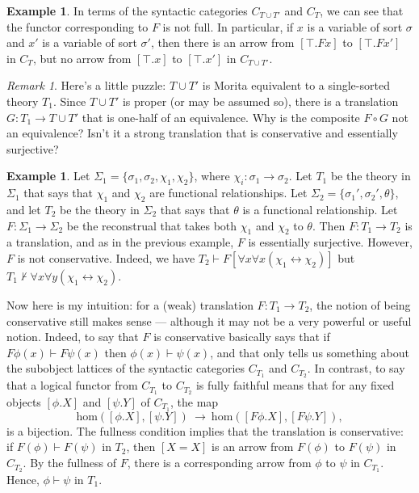 \documentclass[12pt]{article}
\theoremstyle{definition}
\newtheorem{example}[prop]{Example}
\theoremstyle{remark}
\newtheorem*{note}{Remark}
\newcommand{\3}{\mathcal}
\begin{document}
\begin{example}
  In terms of the syntactic categories $C_{T\cup T'}$ and $C_{T}$,
  we can see that the functor corresponding to $F$ is not full. In
  particular, if $x$ is a variable of sort $\sigma$ and $x'$ is a
  variable of sort $\sigma '$, then there is an arrow from
  $[\top .Fx]$ to $[\top .Fx']$ in $C_{T}$, but no arrow from
  $[\top .x]$ to $[\top .x']$ in $C_{T\cup T'}$.  \end{example}

\begin{note} Here's a little puzzle: $T\cup T'$ is Morita equivalent
  to a single-sorted theory $T_1$.  Since $T\cup T'$ is proper (or may
  be assumed so), there is a translation $G:T_1\to T\cup T'$ that is
  one-half of an equivalence. Why is the composite $F\circ G$ not an
  equivalence? Isn't it a strong translation that is conservative and
  essentially surjective? \end{note}

\begin{example} Let
  $\Sigma _1 = \{ \sigma _1,\sigma _2,\chi _1,\chi _2\}$, where
  $\chi _i:\sigma _1\to \sigma _2$. Let $T_1$ be the theory in
  $\Sigma _1$ that says that $\chi _1$ and $\chi _2$ are functional
  relationships. Let $\Sigma _2 =\{ \sigma _1',\sigma _2',\theta \}$,
  and let $T_2$ be the theory in $\Sigma _2$ that says that $\theta$
  is a functional relationship. Let $F:\Sigma _1\to \Sigma _2$ be the
  reconstrual that takes both $\chi _1$ and $\chi _2$ to
  $\theta$. Then $F:T_1\to T_2$ is a translation, and as in the
  previous example, $F$ is essentially surjective. However, $F$ is not
  conservative. Indeed, we have
  $T_2\vdash F[\forall x\forall x(\chi _1\leftrightarrow \chi _2)]$
  but
  $T_1\not\vdash \forall x\forall y(\chi _1\leftrightarrow \chi _2)$.
\end{example}

Now here is my intuition: for a (weak) translation $F:T_1\to T_2$, the
notion of being conservative still makes sense --- although it may not
be a very powerful or useful notion. Indeed, to say that $F$ is
conservative basically says that if $F\phi (x)\vdash F\psi (x)$ then
$\phi (x)\vdash\psi (x)$, and that only tells us something about the
subobject lattices of the syntactic categories $C_{T_1}$ and
$C_{T_2}$. In contrast, to say that a logical functor from $C_{T_1}$
to $C_{T_2}$ is fully faithful means that for any fixed objects
$[\phi .X]$ and $[\psi .Y]$ of $C_{T_1}$, the map
\[ \mathrm{hom}\left( [\phi .X] ,[\psi .Y]\right) \: \to \:
  \mathrm{hom}\left( [F\phi .X] ,[F\psi .Y]\right) ,\] is a
bijection. The fullness condition implies that the translation is
conservative: if $F(\phi )\vdash F(\psi )$ in $T_2$, then $[X=X]$ is
an arrow from $F(\phi )$ to $F(\psi )$ in $C_{T_2}$. By the fullness
of $F$, there is a corresponding arrow from $\phi$ to $\psi$ in
$C_{T_1}$. Hence, $\phi\vdash\psi$ in $T_1$.
\end{document}
